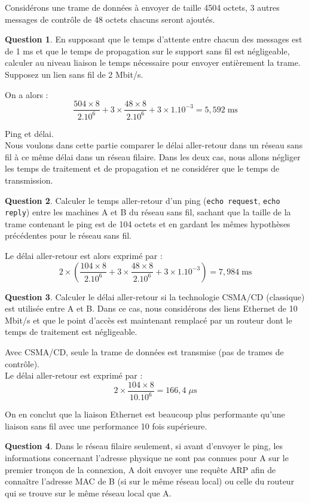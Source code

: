 \documentclass[11pt,english,french]{scrreprt}
\theoremstyle{remark}
\theoremstyle{definition}
\newtheorem{ques}{Question}[section]
\begin{document}
Considérons une trame de données à envoyer de taille 4504 octets, 3 autres messages de contrôle de 48 octets chacuns seront ajoutés.

\begin{ques}
	En supposant que le temps d'attente entre chacun des messages est de 1 ms et que le temps de propagation sur le support sans fil est négligeable, calculer au niveau liaison le temps nécessaire pour envoyer entièrement la trame. Supposez un lien sans fil de 2 Mbit/s.
	
	On a alors :\[\frac{504\times 8}{2.10^6}+3\times\frac{48\times 8}{2.10^{6}}+3\times1.10^{-3}=5,592\;\textrm{ms}\]
\end{ques}

Ping et délai.\\
Nous voulons dans cette partie comparer le délai aller-retour dans un réseau sans fil à ce même délai dans un réseau filaire. Dans les deux cas, nous allons négliger les temps de traitement et de propagation et ne considérer que le temps de transmission.

\begin{ques}
	Calculer le temps aller-retour d'un ping (\lstinline!echo request!, \lstinline!echo reply!) entre les machines A et B du réseau sans fil, sachant que la taille de la trame contenant le ping est de 104 octets et en gardant les mêmes hypothèses précédentes pour le réseau sans fil.
	
	Le délai aller-retour est alors exprimé par : \[2\times\left(\frac{104\times8}{2.10^6}+3\times\frac{48\times 8}{2.10^6}+3\times 1.10^{-3}\right)=7,984\;\textrm{ms}\]
\end{ques}

\begin{ques}
	Calculer le délai aller-retour si la technologie CSMA/CD (classique) est utilisée entre A et B. Dans ce cas, nous considérons des liens Ethernet de 10 Mbit/s et que le point d'accès est maintenant remplacé par un routeur dont le temps de traitement est négligeable. 
	
	Avec CSMA/CD, seule la trame de données est transmise (pas de trames de contrôle).\\
	Le délai aller-retour est exprimé par :\[2\times\frac{104\times 8}{10.10^6}=166,4\;\mu\textrm{s}\]
	
	On en conclut que la liaison Ethernet est beaucoup plus performante qu'une liaison sans fil avec une performance 10 fois supérieure.
\end{ques}

\begin{ques}
	Dans le réseau filaire seulement, si avant d'envoyer le ping, les informations concernant l'adresse physique ne sont pas connues pour A sur le premier tronçon de la connexion, A doit envoyer une requête ARP afin de connaître l'adresse MAC de B (si sur le même réseau local) ou celle du routeur qui se trouve sur le même réseau local que A.
\end{ques}
\end{document}
